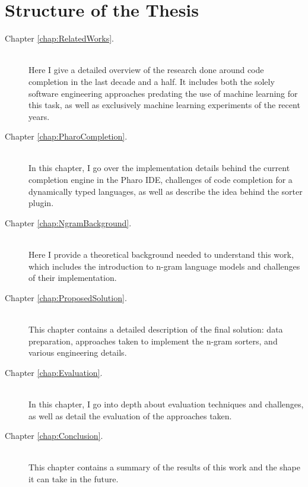 \section{Structure of the Thesis}
\label{sec:Introduction-Structure}
{\hypersetup{linkcolor=black}
\begin{description}
	\item [Chapter \ref{chap:RelatedWorks}. ] \hfill \\
	Here I give a detailed overview of the research done around code completion in the last decade and a half. It includes both the solely software engineering approaches predating the use of machine learning for this task, as well as exclusively machine learning experiments of the recent years.
    \item [Chapter \ref{chap:PharoCompletion}. ] \hfill \\
	In this chapter, I go over the implementation details behind the current completion engine in the Pharo IDE, challenges of code completion for a dynamically typed languages, as well as describe the idea behind the sorter plugin.
	\item [Chapter \ref{chap:NgramBackground}. ] \hfill \\
    Here I provide a theoretical background needed to understand this work, which includes the introduction to n-gram language models and challenges of their implementation.
    \item [Chapter \ref{chap:ProposedSolution}. ] \hfill \\
	This chapter contains a detailed description of the final solution: data preparation, approaches taken to implement the n-gram sorters, and various engineering details.
	\item [Chapter \ref{chap:Evaluation}. ] \hfill \\
    In this chapter, I go into depth about evaluation techniques and challenges, as well as detail the evaluation of the approaches taken.
    \item [Chapter \ref{chap:Conclusion}. ] \hfill \\
	This chapter contains a summary of the results of this work and the shape it can take in the future.
\end{description}
}